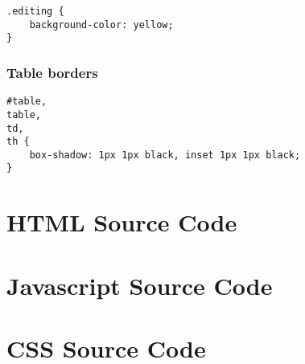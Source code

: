 \documentclass[letterpaper]{article}
\begin{document}
\begin{lstlisting}[firstnumber=65]
.editing {
    background-color: yellow;
}
\end{lstlisting}

\subsubsection{Table borders}

\begin{lstlisting}[firstnumber=69]
#table,
table,
td,
th {
    box-shadow: 1px 1px black, inset 1px 1px black;
}
\end{lstlisting}

\newpage

\appendix
\section{HTML Source Code}


\newpage

\section{Javascript Source Code}


\newpage

\section{CSS Source Code}

\end{document}
